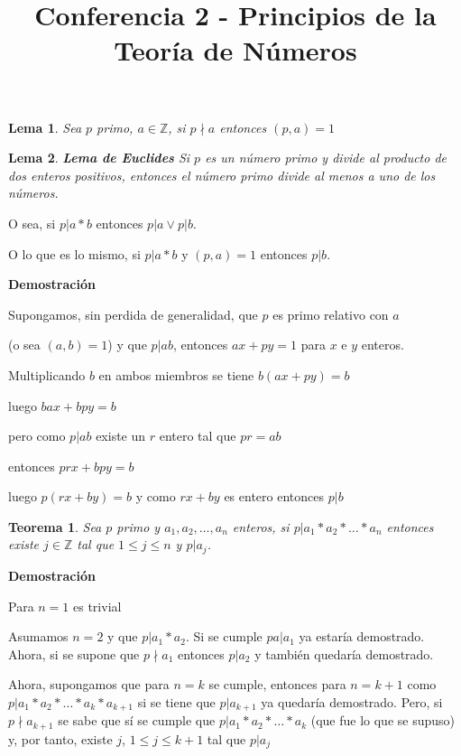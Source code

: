\documentclass[a4paper,12pt]{report}
\title{Conferencia 2 - Principios de la Teoría de Números}
\author{}
\newtheorem*{teo}{Teorema}
\newtheorem*{lem}{Lema}
\begin{document}
\maketitle


\begin{lem}
 Sea $p$ primo, $a\in\mathbb{Z}$, si $p\nmid a$ entonces $(p,a)=1$
\end{lem}

\begin{lem}
 \textbf{Lema de Euclides} Si $p$ es un número primo y divide al producto de dos enteros positivos, entonces el número primo divide al menos a uno de los números. 
\end{lem}

O sea, si $p|a*b$ entonces $p|a\vee p|b$. 

O lo que es lo mismo, si $p|a*b$ y $(p,a)=1$ entonces $p|b$.

\textbf{Demostración}

Supongamos, sin perdida de generalidad, que $p$ es primo relativo con $a$

(o sea $(a,b)=1$) y que $p|ab$, entonces $ax+py=1$ para $x$ e $y$ enteros.

Multiplicando $b$ en ambos miembros se tiene $b(ax+py)=b$ 

luego $bax+bpy=b$

pero como $p|ab$ existe un $r$ entero tal que $pr=ab$

entonces $prx+bpy=b$

luego $p(rx+by)=b$ y como $rx+by$ es entero entonces $p|b$

\begin{teo}
 Sea $p$ primo y $a_1,a_2,\dots,a_n$ enteros, si $p|a_1*a_2*\dots*a_n$ entonces existe $j\in\mathbb{Z}$ tal que $1\leq j\leq n$  y $p|a_j$.
\end{teo}

\textbf{Demostración}

Para $n=1$ es trivial

Asumamos $n=2$ y que $p|a_1*a_2$.  Si se cumple $pa|a_1$ ya estaría demostrado. Ahora, si se supone que $p\nmid a_1$ entonces $p|a_2$ y también quedaría demostrado.

Ahora, supongamos que para $n=k$ se cumple, entonces para $n=k+1$ como $p|a_1*a_2*\dots *a_k*a_{k+1}$ si se tiene que $p|a_{k+1}$ ya quedaría demostrado. Pero, si $p\nmid a_{k+1}$ se sabe que sí se cumple que $p|a_1*a_2*\dots *a_k$ (que fue lo que se supuso) y, por tanto, existe $j$, $1\leq j \leq k+1$ tal que $p|a_j$
\end{document}
